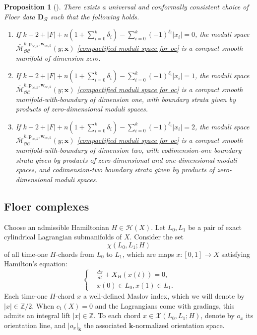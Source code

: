 \documentclass[11pt]{amsproc}
\def\Z{{\mathbb Z}}
\def\K{{\mathbf{k}}}
\def\cR{\mathcal{R}}
\def\oc{\mathcal{OC}}
\def\d{\delta}
\def\M{\mathcal{M}}
\newtheorem{prop}[lem]{Proposition}
\theoremstyle{remark}
\numberwithin{equation}{section}
\begin{document}
\begin{prop}[{\cite[Proposition 3.6]{GGV}}]\label{prop: transversality and compactness of popsicles}
There exists a universal and conformally consistent choice of Floer data $\mathbf{D}_{\cR}$ such that the following holds.
\begin{enumerate}[label=(\roman*)]

\item If $k - 2 + |F| + n(1+\sum_{i=0}^{k} \d_{i}) - \sum_{i=0}^{k} (-1)^{\d_{i}} |x_{i}| = 0$, 
the moduli space $\bar{\M}_{\oc}^{k, \mathbf{p}_{oc, k}, \mathbf{w}_{oc, k}}(y; \mathbf{x})$ \eqref{compactified moduli space for oc} is a compact smooth manifold of dimension zero.

\item If $k - 2 + |F| + n(1+\sum_{i=0}^{k} \d_{i}) - \sum_{i=0}^{k} (-1)^{\d_{i}} |x_{i}| = 1$, 
the moduli space $\bar{\M}_{\oc}^{k, \mathbf{p}_{oc, k}, \mathbf{w}_{oc, k}}(y; \mathbf{x})$ \eqref{compactified moduli space for oc} is a compact smooth manifold-with-boundary of dimension one,
with boundary strata given by products of zero-dimensional moduli spaces.

\item If $k - 2 + |F| + n(1+\sum_{i=0}^{k} \d_{i}) - \sum_{i=0}^{k} (-1)^{\d_{i}} |x_{i}|=2$,
the moduli space $\bar{\M}_{\oc}^{k, \mathbf{p}_{oc, k}, \mathbf{w}_{oc, k}}(y; \mathbf{x})$ \eqref{compactified moduli space for oc} is a compact smooth manifold-with-boundary of dimension two,
with codimension-one boundary strata given by products of zero-dimensional and one-dimensional moduli spaces,
and codimension-two boundary strata given by products of zero-dimensional moduli spaces. 

\end{enumerate}
\end{prop}

\subsection{Floer complexes}

Choose an admissible Hamiltonian $H \in \mathcal{H}(X)$.
Let $L_{0}, L_{1}$ be a pair of exact cylindrical Lagrangian submanifolds of $X$.
Consider the set
\begin{equation}
\chi(L_{0}, L_{1}; H)
\end{equation}
of all time-one $H$-chords from $L_{0}$ to $L_{1}$, 
which are maps $x: [0, 1] \to X$ satisfying Hamilton's equation:
\begin{equation}
\begin{cases}
&\frac{dx}{dt} + X_{H}(x(t)) = 0, \\
&x(0) \in L_{0}, x(1) \in L_{1}.
\end{cases}
\end{equation}
Each time-one $H$-chord $x$ a well-defined Maslov index, 
which we will denote by $|x| \in \Z/2$.
When $c_{1}(X) = 0$ and the Lagrangians come with gradings, 
this admits an integral lift $|x| \in \Z$.
To each chord $x \in \mathcal{X}(L_{0}, L_{1}; H)$, denote by $o_{x}$ its orientation line,
and $|o_x|_{\K}$ the associated $\K$-normalized orientation space.  
\end{document}
